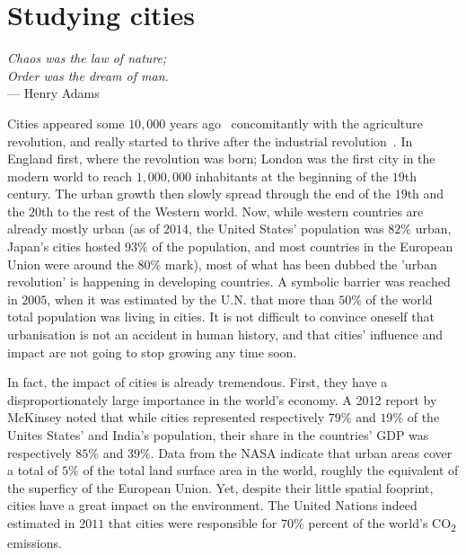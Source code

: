 \chapter{Studying cities}
\label{chap:studying_cities}

\begin{flushright}{\slshape    
Chaos was the law of nature;\\
Order was the dream of man.} \\ \medskip
--- Henry Adams~\cite{Adams:1990}
\end{flushright}

\bigskip

Cities appeared some $10,000$ years ago~\cite{Bairoch:1985, Mumford:1961}
concomitantly with the agriculture revolution, and really started to
thrive after the industrial revolution~\cite{Bairoch:1985}.  In England first,
where the revolution was born; London was the first city in the modern world
to reach $1,000,000$ inhabitants at the beginning of the $19$th century. The
urban growth then slowly spread through the end of the $19$th and the $20$th to
the rest of the Western world. Now, while western countries are already
mostly urban (as of $2014$, the United States' population was $82\%$ urban,
Japan's cities hosted $93\%$ of the population, and most countries in the European Union were around the $80\%$
mark), most of what has been dubbed the 'urban  revolution' is happening in developing countries. A symbolic
barrier was reached in $2005$, when it was estimated by the U.N. that more than
$50\%$ of the world total population was living in cities. It is not difficult
to convince oneself that urbanisation is not an accident in human history, and
that cities' influence and impact are not going to stop growing any time soon.

In fact, the impact of cities is already tremendous. First, they have a
disproportionately large importance in the world's economy. A 2012 report by
McKinsey noted that while cities represented respectively $79\%$ and $19\%$ of the Unites
States' and India's population, their share in the countries' GDP was
respectively $85\%$ and $39\%$. 
Data from the NASA indicate that urban areas cover a total of $5\%$ of the total
land surface area in the world, roughly the equivalent of the superficy of the
European Union. Yet, despite their little spatial fooprint, cities have a great
impact on the environment. The United Nations indeed estimated in $2011$ that cities were
responsible for $70\%$ percent of the world's CO\textsubscript{2} emissions.

